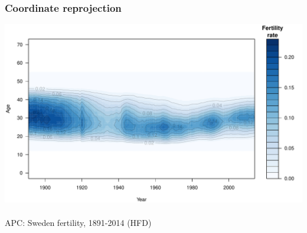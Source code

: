 \documentclass[20pt]{beamer}
\begin{document}






\begin{frame}
\frametitle{Coordinate reprojection}
\includegraphics[scale=.9]{Figures/FertAPC.pdf}\\
$~$\\
APC: Sweden fertility, 1891-2014 (HFD)
\end{frame}
\end{document}
